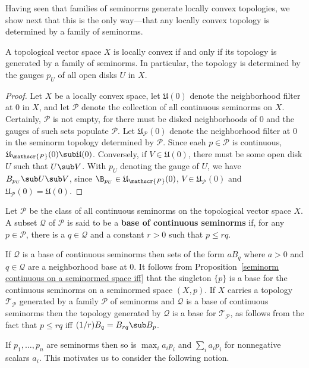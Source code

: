 Having seen that families of seminorrns generate locally convex topologies, we show next that this is the only way---that any locally convex topology is determined by a family of seminorms.
\begin{proposition}\label{LCS iff generated by seminorms}
A topological vector space $X$ is locally convex if and only if its topology is generated by a family of seminorms. In particular, the topology is determined by the gauges $p_U$ of all open disks $U$ in $X$.
\end{proposition}
\begin{proof}
Let $X$ be a locally convex space, let $\mathfrak{U}(0)$ denote the neighborhood filter at $0$ in $X$, and let $\mathscr{P}$ denote the collection of all continuous seminorms on $X$. Certainly, $\mathscr{P}$ is not empty, for there must be disked neighborhoods of $0$ and the gauges of sueh sets populate $\mathscr{P}$. Let $\mathfrak{U}_{\mathscr{P}}(0)$ denote the neighborhood filter at $0$ in the seminorm topology determined by $\mathscr{P}$. Since eaeh $p\in\mathscr{P}$ is continuous, $\mathfrak{U}_{\mathscr{P}}(0)\sub\mathfrak{U}(0)$. Conversely, if $V\in\mathfrak{U}(0)$, there must be some open disk $U$ such that $U\sub V$. With $p_U$ denoting the gauge of $U$, we have $B_{p_U}\sub U\sub V$, since $\B_{p_U}\in\mathfrak{U}_{\mathscr{P}}(0)$, $V\in\mathfrak{U}_{\mathscr{P}}(0)$ and $\mathfrak{U}_{\mathscr{P}}(0)=\mathfrak{U}(0)$.
\end{proof}
\begin{definition}
Let $\mathscr{P}$ be the class of all continuous seminorms on the topological vector space $X$. A subset $\mathscr{Q}$ of $\mathscr{P}$ is said to be a \textbf{base of continuous seminorms} if, for any $p\in\mathscr{P}$, there is a $q\in\mathscr{Q}$ and a constant $r>0$ such that $p\leq rq$.
\end{definition}
If $\mathscr{Q}$ is a base of continuous seminorms then sets of the form $aB_q$ where $a>0$ and $q\in\mathscr{Q}$ are a neighborhood base at $0$. It follows from Proposition~\ref{seminorm continuous on a seminormed space iff} that the singleton $\{p\}$ is a base for the continuous seminorms on a seminormed space $(X,p)$. If $X$ carries a topology $\mathcal{T}_{\mathscr{P}}$ generated by a family $\mathscr{P}$ of seminorms and $\mathscr{Q}$ is a base of continuous seminorms then the topology generated by $\mathscr{Q}$ is a base for $\mathcal{T}_{\mathscr{P}}$, as follows from the fact that $p\leq rq$ iff $(1/r)B_q=B_{rq}\sub B_p$.\par
If $p_1,\dots,p_n$ are seminorms then so is $\max_ia_ip_i$ and $\sum_ia_ip_i$ for nonnegative scalars $a_i$. This motivates us to consider the following notion.
